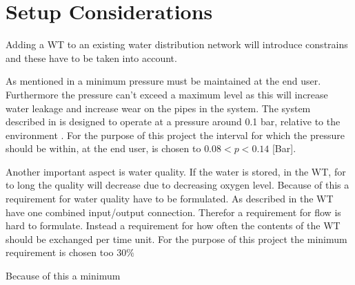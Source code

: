 

\section{Setup Considerations}



Adding a WT to an existing water distribution network will introduce constrains and these have to be taken into account. 

As mentioned in  a minimum pressure must be maintained at the end user. Furthermore the pressure can't exceed a maximum level as this will increase water leakage and increase wear on the pipes in the system. The system described in  is designed to operate at a pressure around 0.1 bar, relative to the environment \cite{master_aau}. For the purpose of this project the interval for which the pressure should be within, at the end user, is chosen to $0.08 < p < 0.14$ [Bar].

Another important aspect is water quality. If the water is stored, in the WT, for to long the quality will decrease due to decreasing oxygen level. Because of this a requirement for water quality have to be formulated. As described in  the WT have one combined input/output connection. Therefor a requirement for flow is hard to formulate. Instead a requirement for how often the contents of the WT should be exchanged per time unit. For the purpose of this project the minimum requirement is chosen too $30\% $



Because of this a minimum 










 
 